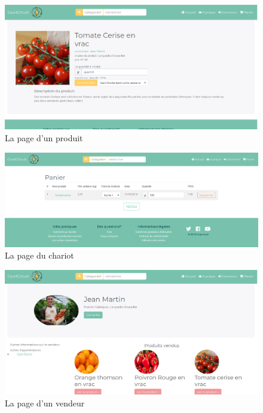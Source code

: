 \documentclass[a4paper,12pt]{report}
\theoremstyle{break}
\theoremstyle{break}
\theoremstyle{break}
\theoremstyle{break}
\theoremstyle{definition}
\theoremstyle{remark}
\begin{document}
\begin{appendices}
\begin{figure}[!ht]
  \centering
  \includegraphics[scale=0.35]{images/produit.png}
  \caption{La page d'un produit}
\end{figure}

\begin{figure}[!ht]
  \centering
  \includegraphics[scale=0.35]{images/cart.png}
  \caption{La page du chariot}
\end{figure}

\begin{figure}[!ht]
  \centering
  \includegraphics[scale=0.35]{images/vendeur.png}
  \caption{La page d'un vendeur}
\end{figure}
\end{appendices}
\end{document}
